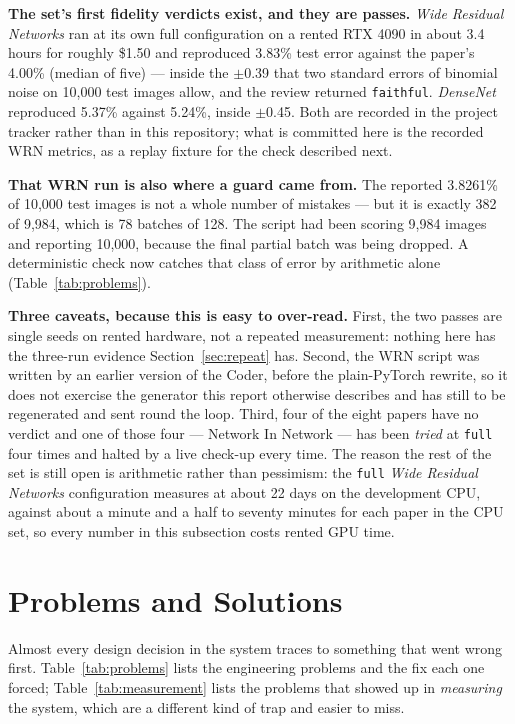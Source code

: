 \documentclass[11pt]{article}
\begin{document}
\textbf{The set's first fidelity verdicts exist, and they are passes.} \emph{Wide Residual
Networks} ran at its own full configuration on a rented RTX 4090 in about 3.4 hours for roughly
\$1.50 and reproduced 3.83\% test error against the paper's 4.00\% (median of five) --- inside
the $\pm$0.39 that two standard errors of binomial noise on 10{,}000 test images allow, and the
review returned \texttt{faithful}. \emph{DenseNet} reproduced 5.37\% against 5.24\%, inside
$\pm$0.45. Both are recorded in the project tracker rather than in this repository; what is
committed here is the recorded WRN metrics, as a replay fixture for the check described next.

\textbf{That WRN run is also where a guard came from.} The reported 3.8261\% of 10{,}000 test
images is not a whole number of mistakes --- but it is exactly 382 of 9{,}984, which is 78
batches of 128. The script had been scoring 9{,}984 images and reporting 10{,}000, because the
final partial batch was being dropped. A deterministic check now catches that class of error by
arithmetic alone (Table~\ref{tab:problems}).

\textbf{Three caveats, because this is easy to over-read.} First, the two passes are single
seeds on rented hardware, not a repeated measurement: nothing here has the three-run evidence
Section~\ref{sec:repeat} has. Second, the WRN script was written by an earlier version of the
Coder, before the plain-PyTorch rewrite, so it does not exercise the generator this report
otherwise describes and has still to be regenerated and sent round the loop. Third, four of the
eight papers have no verdict and one of those four --- Network In Network --- has been
\emph{tried} at \texttt{full} four times and halted by a live check-up every time. The reason the
rest of the set is still open is arithmetic rather than pessimism: the \texttt{full} \emph{Wide
Residual Networks} configuration measures at about 22 days on the development CPU, against about
a minute and a half to seventy minutes for each paper in the CPU set, so every number in this
subsection costs rented GPU time.

\section{Problems and Solutions}
\label{sec:problems}

Almost every design decision in the system traces to something that went wrong first.
Table~\ref{tab:problems} lists the engineering problems and the fix each one forced;
Table~\ref{tab:measurement} lists the problems that showed up in \emph{measuring} the system,
which are a different kind of trap and easier to miss.
\end{document}
